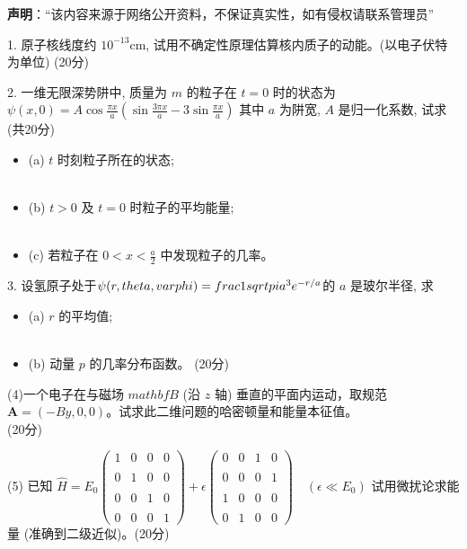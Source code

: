 
\textbf{声明}：“该内容来源于网络公开资料，不保证真实性，如有侵权请联系管理员”

1. 原子核线度约 $10^{-13} \text{cm}$, 试用不确定性原理估算核内质子的动能。(以电子伏特为单位)  (20分)

2. 一维无限深势阱中, 质量为 $m$ 的粒子在 $t=0$ 时的状态为 
$\psi(x,0) = A \cos \frac{\pi x}{a} \left( \sin \frac{3 \pi x}{a} - 3 \sin \frac{\pi x}{a} \right)$
其中 $a$ 为阱宽, $A$ 是归一化系数, 试求 (共20分) 
\begin{itemize}
\item  (a) $t$ 时刻粒子所在的状态; \\\\
\item  (b) $t>0$ 及 $t=0$ 时粒子的平均能量; \\\\
\item  (c) 若粒子在 $0 < x < \frac{a}{2}$ 中发现粒子的几率。\\
\end{itemize}
3. 设氢原子处于$\psi(r, \\theta, \\varphi) = \\frac{1}{\\sqrt{\\pi a^3}} e^{-r/a}$的 $a$ 是玻尔半径, 求 
\begin{itemize}
\item (a) $r$ 的平均值; \\\\
\item  (b) 动量 $p$ 的几率分布函数。  (20分)
\end{itemize}
(4)一个电子在与磁场 $mathbf{B}$ (沿 $z$ 轴) 垂直的平面内运动，取规范 $\mathbf{A} = (-By, 0, 0)$。试求此二维问题的哈密顿量和能量本征值。\\  (20分)

(5) 已知
$\hat{H} = E_0 \begin{pmatrix}1 & 0 & 0 & 0 \\\\0 & 1 & 0 & 0 \\\\0 & 0 & 1 & 0 \\\\0 & 0 & 0 & 1 \end{pmatrix}+ \epsilon \begin{pmatrix}0 & 0 & 1 & 0 \\\\0 & 0 & 0 & 1 \\\\1 & 0 & 0 & 0 \\\\0 & 1 & 0 & 0 \end{pmatrix}\quad \left( \epsilon \ll E_0 \right)$
试用微扰论求能量 (准确到二级近似)。(20分)

